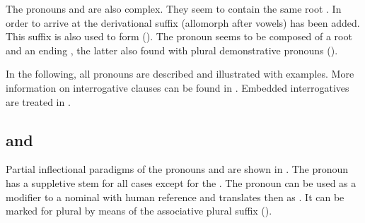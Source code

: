 The pronouns  and  are also complex. They seem to contain the same root \mbox{.} In order to arrive at  the derivational suffix  (allomorph \mbox{} after vowels) has been added. This suffix is also used to form  (). The pronoun  seems to be composed of a root  and an ending , the latter also found with plural demonstrative pronouns ().

In the following, all pronouns are described and illustrated with examples. More information on interrogative clauses can be found in . Embedded interrogatives are treated in .



\subsection{  and  }
\label{ssec:ca who and ce what}

Partial inflectional paradigms of the pronouns   and   are shown in . The pronoun  has a suppletive stem  for all cases except for the  . The pronoun  can be used as a modifier to a nominal with human reference and translates then as  . It can be marked for plural by means of the associative plural suffix   ().

